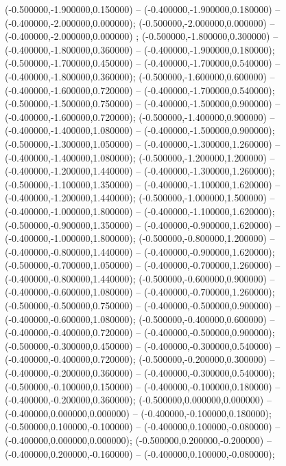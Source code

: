  (-0.500000,-1.900000,0.150000) -- (-0.400000,-1.900000,0.180000) -- (-0.400000,-2.000000,0.000000);
 (-0.500000,-2.000000,0.000000) -- (-0.400000,-2.000000,0.000000) ;
 (-0.500000,-1.800000,0.300000) -- (-0.400000,-1.800000,0.360000) -- (-0.400000,-1.900000,0.180000);
 (-0.500000,-1.700000,0.450000) -- (-0.400000,-1.700000,0.540000) -- (-0.400000,-1.800000,0.360000);
 (-0.500000,-1.600000,0.600000) -- (-0.400000,-1.600000,0.720000) -- (-0.400000,-1.700000,0.540000);
 (-0.500000,-1.500000,0.750000) -- (-0.400000,-1.500000,0.900000) -- (-0.400000,-1.600000,0.720000);
 (-0.500000,-1.400000,0.900000) -- (-0.400000,-1.400000,1.080000) -- (-0.400000,-1.500000,0.900000);
 (-0.500000,-1.300000,1.050000) -- (-0.400000,-1.300000,1.260000) -- (-0.400000,-1.400000,1.080000);
 (-0.500000,-1.200000,1.200000) -- (-0.400000,-1.200000,1.440000) -- (-0.400000,-1.300000,1.260000);
 (-0.500000,-1.100000,1.350000) -- (-0.400000,-1.100000,1.620000) -- (-0.400000,-1.200000,1.440000);
 (-0.500000,-1.000000,1.500000) -- (-0.400000,-1.000000,1.800000) -- (-0.400000,-1.100000,1.620000);
 (-0.500000,-0.900000,1.350000) -- (-0.400000,-0.900000,1.620000) -- (-0.400000,-1.000000,1.800000);
 (-0.500000,-0.800000,1.200000) -- (-0.400000,-0.800000,1.440000) -- (-0.400000,-0.900000,1.620000);
 (-0.500000,-0.700000,1.050000) -- (-0.400000,-0.700000,1.260000) -- (-0.400000,-0.800000,1.440000);
 (-0.500000,-0.600000,0.900000) -- (-0.400000,-0.600000,1.080000) -- (-0.400000,-0.700000,1.260000);
 (-0.500000,-0.500000,0.750000) -- (-0.400000,-0.500000,0.900000) -- (-0.400000,-0.600000,1.080000);
 (-0.500000,-0.400000,0.600000) -- (-0.400000,-0.400000,0.720000) -- (-0.400000,-0.500000,0.900000);
 (-0.500000,-0.300000,0.450000) -- (-0.400000,-0.300000,0.540000) -- (-0.400000,-0.400000,0.720000);
 (-0.500000,-0.200000,0.300000) -- (-0.400000,-0.200000,0.360000) -- (-0.400000,-0.300000,0.540000);
 (-0.500000,-0.100000,0.150000) -- (-0.400000,-0.100000,0.180000) -- (-0.400000,-0.200000,0.360000);
 (-0.500000,0.000000,0.000000) -- (-0.400000,0.000000,0.000000) -- (-0.400000,-0.100000,0.180000);
 (-0.500000,0.100000,-0.100000) -- (-0.400000,0.100000,-0.080000) -- (-0.400000,0.000000,0.000000);
 (-0.500000,0.200000,-0.200000) -- (-0.400000,0.200000,-0.160000) -- (-0.400000,0.100000,-0.080000);
